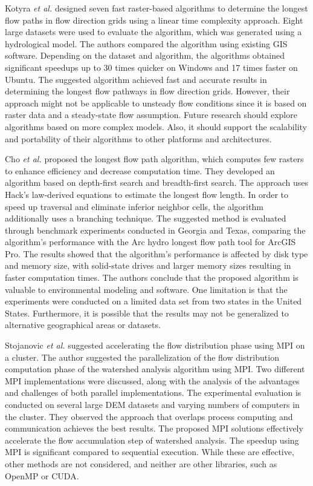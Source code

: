 \documentclass[journal, a4paper]{IEEEtran}
\begin{document}
	Kotyra \textit{et al.} \cite{KOTYRA2023105728} designed seven fast raster-based algorithms to determine the longest flow paths in flow direction grids using a linear time complexity approach. Eight large datasets were used to evaluate the algorithm, which was generated using a hydrological model. The authors compared the algorithm using existing GIS software. Depending on the dataset and algorithm, the algorithms obtained significant speedups up to 30 times quicker on Windows and 17 times faster on Ubuntu. The suggested algorithm achieved fast and accurate results in determining the longest flow pathways in flow direction grids. However, their approach might not be applicable to unsteady flow conditions since it is based on raster data and a steady-state flow assumption. Future research should explore algorithms based on more complex models. Also, it should support the scalability and portability of their algorithms to other platforms and architectures.
	
	Cho \textit{et al.} \cite{CHO2020104774} proposed the longest flow path algorithm, which computes few rasters to enhance efficiency and decrease computation time. They developed an algorithm based on depth-first search and breadth-first search. The approach uses Hack's law-derived equations to estimate the longest flow length. In order to speed up traversal and eliminate inferior neighbor cells, the algorithm additionally uses a branching technique. The suggested method is evaluated through benchmark experiments conducted in Georgia and Texas, comparing the algorithm's performance with the Arc hydro longest flow path tool for ArcGIS Pro. The results showed that the algorithm's performance is affected by disk type and memory size, with solid-state drives and larger memory sizes resulting in faster computation times. The authors conclude that the proposed algorithm is valuable to environmental modeling and software. One limitation is that the experiments were conducted on a limited data set from two states in the United States. Furthermore, it is possible that the results may not be generalized to alternative geographical areas or datasets.  
	
	Stojanovic \textit{et al.} \cite{stojanovic2020accelerating} suggested accelerating the flow distribution phase using MPI on a cluster. The author suggested the parallelization of the flow distribution computation phase of the watershed analysis algorithm using MPI. Two different MPI implementations were discussed, along with the analysis of the advantages and challenges of both parallel implementations. The experimental evaluation is conducted on several large DEM datasets and varying numbers of computers in the cluster. They observed the approach that overlaps process computing and communication achieves the best results. The proposed MPI solutions effectively accelerate the flow accumulation step of watershed analysis. The speedup using MPI is significant compared to sequential execution. While these are effective, other methods are not considered, and neither are other libraries, such as OpenMP or CUDA.
	
\end{document}
